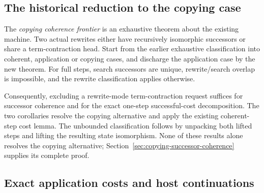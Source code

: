 


\subsection{The historical reduction to the copying case}

The \emph{copying coherence frontier} is an exhaustive theorem about the
existing machine. Two actual rewrites either have recursively isomorphic
successors or share a term-contraction head. Start from the earlier exhaustive
classification into coherent, application or copying cases, and discharge the
application case by the new theorem. For full steps, search successors are
unique, rewrite/search overlap is impossible, and the rewrite classification
applies otherwise.



Consequently, excluding a rewrite-mode term-contraction request suffices for
successor coherence and for the exact one-step successful-cost decomposition.
The two corollaries resolve the copying alternative and apply the existing
coherent-step cost lemma. The unbounded classification follows by unpacking
both lifted steps and lifting the resulting state isomorphism. None of these
results alone resolves the copying alternative; Section~\ref{sec:copying-successor-coherence} supplies its complete proof.




\subsection{Exact application costs and host continuations}


